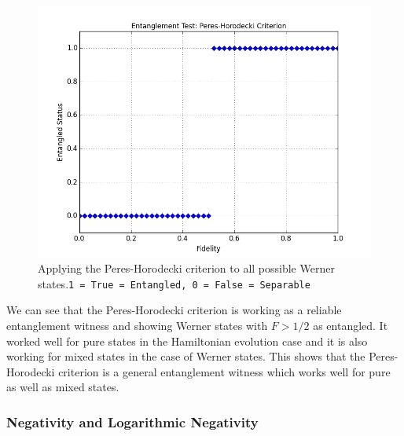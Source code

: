 \begin{figure}[H]
  \begin{center}
    \includegraphics[scale=0.62]{figures/wernerstates-phcriterion.png}
    \caption{Applying the Peres-Horodecki criterion to all possible Werner states.\newline \texttt{1 = True = Entangled,    0 = False = Separable}}
    \label{fig: Werner States: Peres-Horodecki Criterion}
  \end{center}
\end{figure}

\par We can see that the Peres-Horodecki criterion is working as a reliable entanglement witness and showing Werner states with $F>1/2$ as entangled. It worked well for pure states in the Hamiltonian evolution case and it is also working for mixed states in the case of Werner states. This shows that the Peres-Horodecki criterion is a general entanglement witness which works well for pure as well as mixed states.


\subsubsection{Negativity and Logarithmic Negativity}

